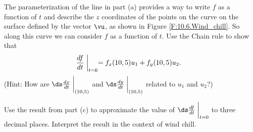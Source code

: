 \begin{pa}
\begin{comment}
A parameterization $\langle x(t), y(t) \rangle$ of the line in the plane through the point $(10,5)$ in the direction of the vector $\vu$ is
\[x(t) = 10 + u_1t, \ \ \ \ y(t) = 5+u_2t.\]



\end{comment}

    \item The parameterization of the line in part (a) provides a way to write $f$ as a function of $t$ and describe the $z$ coordinates of the points on the curve on the surface defined by the vector $\vu$, as shown in Figure \ref{F:10.6.Wind_chill}. So along this curve we can consider $f$ as a function of $t$. Use the Chain rule to show that
        \begin{equation} \label{eq:10.6.DD_formula}
        \frac{df}{dt}\biggm|_{t=0} = f_x(10,5) u_1 + f_y(10,5) u_2.
        \end{equation}
        (Hint: How are $\ds \frac{dx}{dt}\biggm|_{(10,5)}$ and $\ds \frac{dy}{dt}\biggm|_{(10,5)}$ related to $u_1$ and $u_2$?)



\begin{comment}

The Chain Rule states that
\[\frac{df}{dt} = \frac{\partial f}{\partial x} \frac{dx}{dt} + \frac{\partial f}{\partial y} \frac{dy}{dt}.\]
At the point $(10,5)$ (when $t=0$) and along the curve on the surface determined by the vector $\vu$, we have ${\ds \frac{dx}{dt}\biggm|_{t=0} = u_1}$ and ${\ds \frac{df}{dt}\biggm|_{t=0} = u_2}$. So
\[\frac{df}{dt}\biggm|_{t=0} &= f_x(10,5) u_1 + f_y(10,5) u_2.\]



\end{comment}

    \item Use the result from part (c) to approximate the value of $\ds \frac{df}{dt}\biggm|_{t=0}$ to three decimal places. Interpret the result in the context of wind chill.



\begin{comment}
In this case we have
\[f_x(x,y) =  0.6215+0.4275y^{0.16} \ \ \ \ \text{ and } \ \ \ \ f_y(x,y) = (5.72+0.0684x)y^{-0.84}.\]
So
\begin{align*}
\frac{df}{dt}\biggm|_{t=0} &= f_x(10,5) \left(\frac{3}{\sqrt{10}}\right) + f_y(10,5) \left(\frac{1}{\sqrt{10}}\right) \\
    &approx (1.175) \left(\frac{3}{\sqrt{10}}\right) + (-1.303) \left(\frac{1}{\sqrt{10}}\right)  \\
    &\approx 0.993.
\end{align*}
This number tells us that if we increase the temperature and wind speed at the point $(10,5)$ in the ratio of 3:1, then wind chill will increase by approximately 1 degree Fahrenheit.



\end{comment}


    \ea

\end{pa} \afterpa 